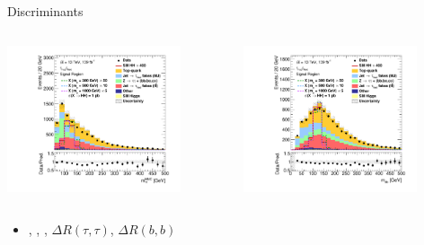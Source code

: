 \documentclass[11pt, xcolor={dvipsnames}, aspectratio=169]{beamer}
\begin{document}

\begin{frame}{Discriminants}

  \begin{columns}[onlytextwidth]
    \centering

    \includegraphics[width=0.8\textwidth]{mva/prefit/Region_BMin0_incJet1_distmMMC_J2_Y2015_DLLOS_T2_SpcTauHH_L0_Prefit}

    \centering

    \includegraphics[width=0.8\textwidth]{mva/prefit/Region_BMin0_incJet1_distmBB_J2_Y2015_DLLOS_T2_SpcTauHH_L0_Prefit}
  \end{columns}


  \begin{itemize}
  \item \mMMC, \mBB, \mHH, $\Delta R(\tau, \tau)$, $\Delta R(b, b)$
  \end{itemize}
  
\end{frame}
\end{document}
